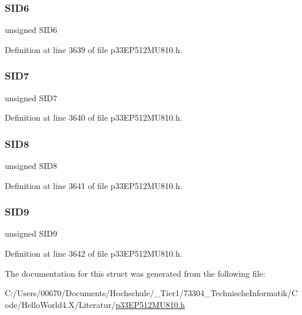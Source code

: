 \subsubsection{\texorpdfstring{S\+I\+D6}{SID6}}
{\footnotesize\ttfamily unsigned S\+I\+D6}



Definition at line 3639 of file p33\+E\+P512\+M\+U810.\+h.

\mbox{\label{structtag_c1_r_x_m2_s_i_d_b_i_t_s_a34097fb76decd431701fa2d86a22328e}} 
\subsubsection{\texorpdfstring{S\+I\+D7}{SID7}}
{\footnotesize\ttfamily unsigned S\+I\+D7}



Definition at line 3640 of file p33\+E\+P512\+M\+U810.\+h.

\mbox{\label{structtag_c1_r_x_m2_s_i_d_b_i_t_s_afe74894633244fdb0b0c01b4e8c522e7}} 
\subsubsection{\texorpdfstring{S\+I\+D8}{SID8}}
{\footnotesize\ttfamily unsigned S\+I\+D8}



Definition at line 3641 of file p33\+E\+P512\+M\+U810.\+h.

\mbox{\label{structtag_c1_r_x_m2_s_i_d_b_i_t_s_a33587704948067005c2a6a3ccc503c99}} 
\subsubsection{\texorpdfstring{S\+I\+D9}{SID9}}
{\footnotesize\ttfamily unsigned S\+I\+D9}



Definition at line 3642 of file p33\+E\+P512\+M\+U810.\+h.



The documentation for this struct was generated from the following file\+:\begin{DoxyCompactItemize}
\item 
C\+:/\+Users/00670/\+Documents/\+Hochschule/\+\_\+\+Tier1/73304\+\_\+\+Technische\+Informatik/\+Code/\+Hello\+World4.\+X/\+Literatur/\hyperlink{p33_e_p512_m_u810_8h}{p33\+E\+P512\+M\+U810.\+h}\end{DoxyCompactItemize}
